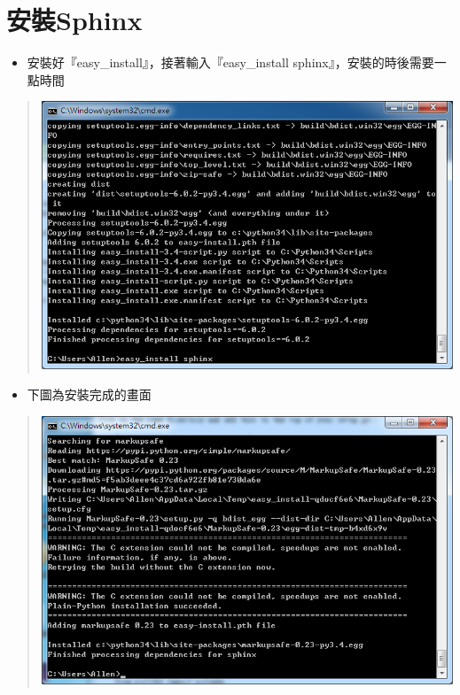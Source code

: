 \documentclass[letterpaper,10pt,english]{sphinxmanual}
\begin{document}
\section{安裝Sphinx}
\label{_doc/sphinx-doc-win/index:sphinx}\begin{itemize}
\item {} 
安裝好『easy\_install』，接著輸入『easy\_install sphinx』，安裝的時後需要一點時間

\end{itemize}
\begin{quote}

\includegraphics{Python-Sphinx-001.png}
\end{quote}
\begin{itemize}
\item {} 
下圖為安裝完成的畫面

\end{itemize}
\begin{quote}

\includegraphics{Python-Sphinx-002.png}
\end{quote}
\end{document}
